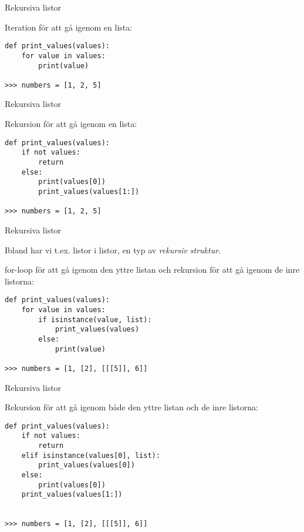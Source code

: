 \documentclass{beamer}
\begin{document}
  \begin{frame}[fragile]{Rekursiva listor}

    Iteration för att gå igenom en lista:

    \begin{verbatim}
def print_values(values):
    for value in values:
        print(value)

>>> numbers = [1, 2, 5]
    \end{verbatim}

  \end{frame}

  \begin{frame}[fragile]{Rekursiva listor}

    Rekursion för att gå igenom en lista:

    \begin{verbatim}
def print_values(values):
    if not values:
        return
    else:
        print(values[0])
        print_values(values[1:])

>>> numbers = [1, 2, 5]
    \end{verbatim}

  \end{frame}

  \begin{frame}[fragile]{Rekursiva listor}

    Ibland har vi t.ex. listor i listor, en typ av \emph{rekursiv struktur}.

    \pause{}

    for-loop för att gå igenom den yttre listan och rekursion för att gå igenom de inre listorna:

    \pause{}

    \begin{verbatim}
def print_values(values):
    for value in values:
        if isinstance(value, list):
            print_values(values)
        else:
            print(value)

>>> numbers = [1, [2], [[[5]], 6]]

    \end{verbatim}

  \end{frame}

  \begin{frame}[fragile]{Rekursiva listor}

    Rekursion för att gå igenom både den yttre listan och de inre listorna:

    \begin{verbatim}
def print_values(values):
    if not values:
        return
    elif isinstance(values[0], list):
        print_values(values[0])
    else:
        print(values[0])
    print_values(values[1:])


>>> numbers = [1, [2], [[[5]], 6]]

    \end{verbatim}

  \end{frame}
\end{document}
